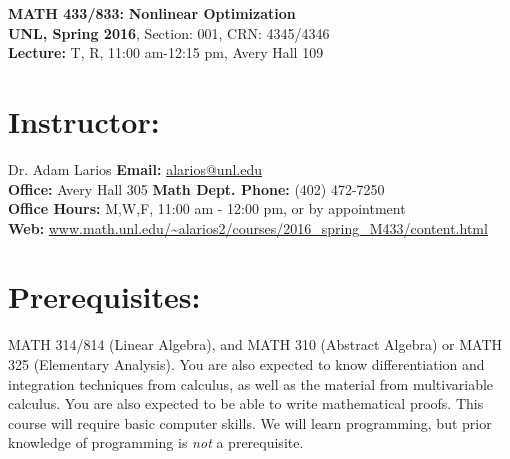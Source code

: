 \documentclass[margin]{res}
\theoremstyle{plain}
\theoremstyle{definition}
\theoremstyle{remark}
\begin{document}
\begin{center}
   \textbf{MATH 433/833:} 
   \textbf{Nonlinear Optimization}\\
   \textbf{UNL, Spring 2016}, Section: 001, CRN: 4345/4346
    \\
   \textbf{Lecture:} T, R, 11:00 am-12:15 pm, Avery Hall 109\\
\end{center}
%
\vspace{-0.2in}
%
\begin{resume}
\section{Instructor:} Dr. Adam Larios 
\hfill \textbf{Email:} 
\url{alarios@unl.edu}
\\
\textbf{Office:} Avery Hall 305
\hfill
\textbf{Math Dept. Phone:} (402) 472-7250
\\
\textbf{Office Hours:} M,W,F, 11:00 am - 12:00 pm, or by appointment
\hfill
\\
\textbf{Web:} \url{www.math.unl.edu/~alarios2/courses/2016_spring_M433/content.html}



 \section{Prerequisites:} MATH 314/814 (Linear Algebra), and MATH 310 (Abstract Algebra) or MATH 325 (Elementary Analysis).  You are also expected to know differentiation and integration techniques from calculus, as well as the material from multivariable calculus.   You are also expected to be able to write mathematical proofs.  This course will require basic computer skills.  We will learn programming, but prior knowledge of programming is \textit{not} a prerequisite.
 

\end{resume}
\end{document}
